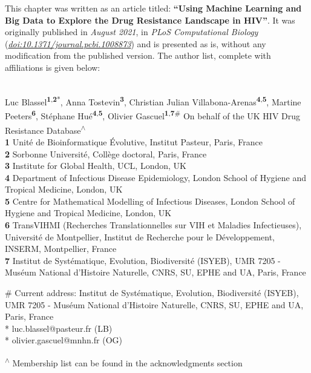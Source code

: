 \documentclass[
  11pt,
  twoside,
  BCOR=10mm,
  listof=totoc]{scrbook}
\begin{document}
This chapter was written as an article titled: \textbf{``Using Machine Learning and Big Data to Explore the Drug Resistance Landscape in HIV''}. It was originally published in \emph{August 2021}, in \emph{PLoS Computational Biology} (\href{https://doi.org/10.1371/journal.pcbi.1008873}{\emph{doi:10.1371/journal.pcbi.1008873}}) and is presented as is, without any modification from the published version. The author list, complete with affiliations is given below:\\
\strut \\

Luc Blassel\textsuperscript{\textbf{1},\textbf{2}*}, Anna Tostevin\textsuperscript{\textbf{3}}, Christian Julian
Villabona-Arenas\textsuperscript{\textbf{4},\textbf{5}}, Martine Peeters\textsuperscript{\textbf{6}}, Stéphane Hué\textsuperscript{\textbf{4},\textbf{5}}, Olivier
Gascuel\textsuperscript{\textbf{1},\textbf{7}\#} On behalf of the UK HIV Drug Resistance
Database\textsuperscript{\(\wedge\)}\\

\textbf{1} Unité de Bioinformatique Évolutive, Institut Pasteur, Paris,
France\\
\textbf{2} Sorbonne Université, Collège doctoral, Paris, France\\
\textbf{3} Institute for Global Health, UCL, London, UK\\
\textbf{4} Department of Infectious Disease Epidemiology, London School of
Hygiene and Tropical Medicine, London, UK\\
\textbf{5} Centre for Mathematical Modelling of Infectious Diseases, London
School of Hygiene and Tropical Medicine, London, UK\\
\textbf{6} TransVIHMI (Recherches Translationnelles sur VIH et Maladies
Infectieuses), Université de Montpellier, Institut de Recherche pour le
Développement, INSERM, Montpellier, France\\
\textbf{7} Institut de Systématique, Evolution, Biodiversité (ISYEB), UMR
7205 - Muséum National d'Histoire Naturelle, CNRS, SU, EPHE and UA,
Paris, France

\# Current address: Institut de Systématique, Evolution, Biodiversité
(ISYEB), UMR 7205 - Muséum National d'Histoire Naturelle, CNRS, SU, EPHE
and UA, Paris, France\\
* luc.blassel@pasteur.fr (LB)\\
* olivier.gascuel@mnhn.fr (OG)

\textsuperscript{\(\wedge\)} Membership list can be found in the acknowledgments section
\end{document}
